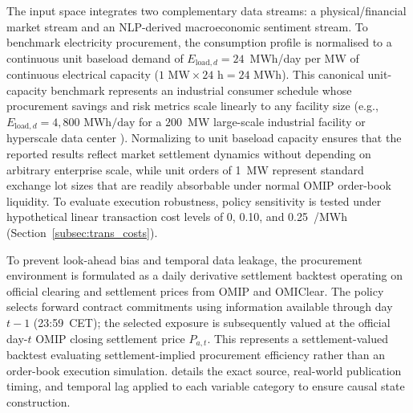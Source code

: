 The input space integrates two complementary data streams: a physical/financial market stream and an NLP-derived macroeconomic sentiment stream. To benchmark electricity procurement, the consumption profile is normalised to a continuous unit baseload demand of $E_{\text{load}, d} = 24$~MWh/day per MW of continuous electrical capacity ($1\text{ MW} \times 24\text{ h} = 24\text{ MWh}$). This canonical unit-capacity benchmark represents an industrial consumer schedule whose procurement savings and risk metrics scale linearly to any facility size (e.g., $E_{\text{load}, d} = 4{,}800\text{ MWh/day}$ for a $200$~MW large-scale industrial facility or hyperscale data center \cite{masanet2020recalibrating, iea2024electricity}). Normalizing to unit baseload capacity ensures that the reported results reflect market settlement dynamics without depending on arbitrary enterprise scale, while unit orders of 1~MW represent standard exchange lot sizes that are readily absorbable under normal OMIP order-book liquidity. To evaluate execution robustness, policy sensitivity is tested under hypothetical linear transaction cost levels of 0, 0.10, and 0.25~\texteuro/MWh (Section~\ref{subsec:trans_costs}).

To prevent look-ahead bias and temporal data leakage, the procurement environment is formulated as a daily derivative settlement backtest operating on official clearing and settlement prices from OMIP and OMIClear. The policy selects forward contract commitments using information available through day $t-1$ (23:59~CET); the selected exposure is subsequently valued at the official day-$t$ OMIP closing settlement price $P_{a, t}$. This represents a settlement-valued backtest evaluating settlement-implied procurement efficiency rather than an order-book execution simulation.  details the exact source, real-world publication timing, and temporal lag applied to each variable category to ensure causal state construction.

